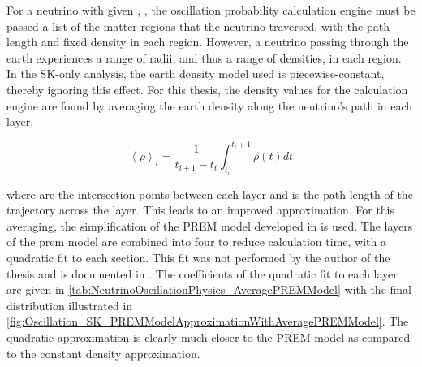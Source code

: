 For a neutrino with given , , the oscillation probability calculation engine must be passed a list of the matter regions that the neutrino traversed, with the path length and fixed density in each region. However, a neutrino passing through the earth experiences a range of radii, and thus a range of densities, in each region. In the SK-only analysis, the earth density model used is piecewise-constant, thereby ignoring this effect. For this thesis, the density values for the calculation engine are found by averaging the earth density along the neutrino's path in each layer,

\begin{equation}
  \left< \rho \right>_{i} = \frac{1}{t_{i+1}-t_{i}} \int^{t_{i}+1}_{t_{i}} \rho(t) dt
\end{equation}

where  are the intersection points between each layer and  is the path length of the trajectory across the layer. This leads to an improved approximation. For this averaging, the simplification of the PREM model developed in \cite{EarthGrav} is used. The layers of the prem model are combined into four to reduce calculation time, with a quadratic fit to each section. This fit was not performed by the author of the thesis and is documented in \cite{t2k_tn_425}. The coefficients of the quadratic fit to each layer are given in \autoref{tab:NeutrinoOscillationPhysics_AveragePREMModel} with the final distribution illustrated in \autoref{fig:Oscillation_SK_PREMModelApproximationWithAveragePREMModel}. The quadratic approximation is clearly much closer to the PREM model as compared to the constant density approximation. 


